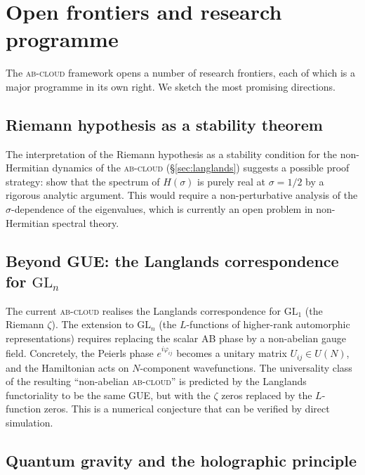 \documentclass[11pt,a4paper]{article}
\theoremstyle{plain}
\theoremstyle{definition}
\theoremstyle{remark}
\newcommand{\Abcloud}{\textsc{ab-cloud}}
\begin{document}
\section{Open frontiers and research programme}\label{sec:frontiers}

The \Abcloud{} framework opens a number of research frontiers, each of which is a major programme in its own right. We sketch the most promising directions.

\subsection{Riemann hypothesis as a stability theorem}

The interpretation of the Riemann hypothesis as a stability condition for the non-Hermitian dynamics of the \Abcloud{} (\S\ref{sec:langlands}) suggests a possible proof strategy: show that the spectrum of $H(\sigma)$ is purely real at $\sigma = 1/2$ by a rigorous analytic argument. This would require a non-perturbative analysis of the $\sigma$-dependence of the eigenvalues, which is currently an open problem in non-Hermitian spectral theory.

\subsection{Beyond GUE: the Langlands correspondence for $\mathrm{GL}_n$}

The current \Abcloud{} realises the Langlands correspondence for $\mathrm{GL}_1$ (the Riemann $\zeta$). The extension to $\mathrm{GL}_n$ (the $L$-functions of higher-rank automorphic representations) requires replacing the scalar AB phase by a non-abelian gauge field. Concretely, the Peierls phase $e^{i\varphi_{ij}}$ becomes a unitary matrix $U_{ij}\in U(N)$, and the Hamiltonian acts on $N$-component wavefunctions. The universality class of the resulting ``non-abelian \Abcloud{}'' is predicted by the Langlands functoriality to be the same GUE, but with the $\zeta$ zeros replaced by the $L$-function zeros. This is a numerical conjecture that can be verified by direct simulation.

\subsection{Quantum gravity and the holographic principle}
\end{document}
